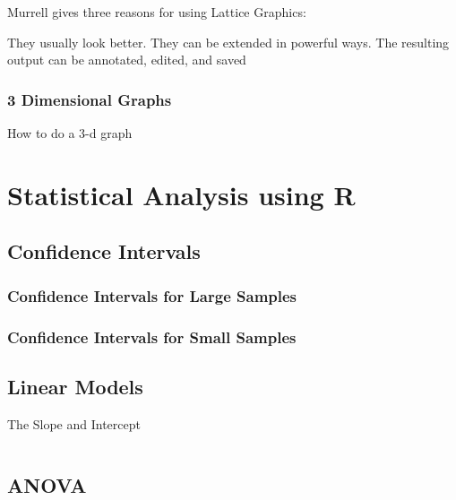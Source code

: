\documentclass[a4paper,12pt]{article}
\begin{document}
Murrell gives three reasons for using Lattice Graphics:

They usually look better.
They can be extended in powerful ways.
The resulting output can be annotated, edited, and saved

\subsection{3 Dimensional Graphs}
How to do a 3-d graph

\newpage
\chapter{Statistical Analysis using R}
\section{Confidence Intervals}
\subsection{Confidence Intervals for Large Samples}
\subsection{Confidence Intervals for Small Samples}

\section{Linear Models}

The Slope and Intercept
\begin{myindentpar}{1cm}
\begin{verbatim}

\end{verbatim}
\end{myindentpar}

\section{ANOVA}
\end{document}
